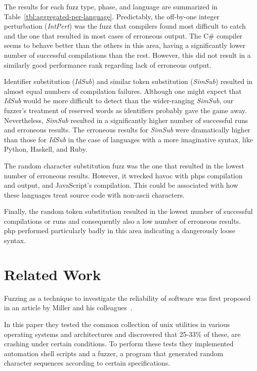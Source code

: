 \documentclass[10pt]{sigplanconf}
\begin{document}
The results for each fuzz type, phase, and language are summarized in
Table~\ref{tbl:aggregated-per-language}.
Predictably, the off-by-one integer perturbation ({\em IntPert})
was the fuzz that
compilers found most difficult to catch and the one that resulted
in most cases of erroneous output.
The C\# compiler seems to behave better than the others in this area,
having a significantly lower number of successful compilations than the
rest.
However, this did not result in a similarly good performance rank
regarding lack of erroneous output.

Identifier substitution ({\em IdSub}) and similar token substitution
({\em SimSub}) resulted in almost equal numbers of compilation failures.
Although one might expect that {\em IdSub} would be more difficult
to detect than the wider-ranging {\em SimSub},
our fuzzer's treatment of reserved words as identifiers
probably gave the game away.
Nevertheless, {\em SimSub} resulted in a significantly higher number
of successful runs and erroneous results.
The erroneous results for {\em SimSub} were dramatically higher
than those for {\em IdSub} in the case of
languages with a more imaginative syntax, like Python, Haskell, and Ruby.

The random character substitution fuzz was the one that resulted
in the lowest number of erroneous results.
However, it wrecked havoc with {\sc php}s compilation and output,
and JavaScript's compilation.
This could be associated with how these languages treat source code
with non-{\sc ascii} characters.

Finally, the random token substitution resulted in the lowest number
of successful compilations or runs and consequently
also a low number of erroneous results.
{\sc php} performed particularly badly in this area indicating a
dangerously loose syntax.

\section{Related Work} %
\label{sec:related}

Fuzzing as a technique to investigate the reliability of software
was first proposed in an article by Miller and his colleagues~\cite{MFS90}.

In this paper they tested the common collection of {\sc unix}
utilities in various operating systems and architectures and discrovered that
25-33\% of these, are crashing under certain conditions. To perform these tests
they implemented automation shell scripts and a fuzzer, a program that generated
random character sequences according to certain specifications.
\end{document}
